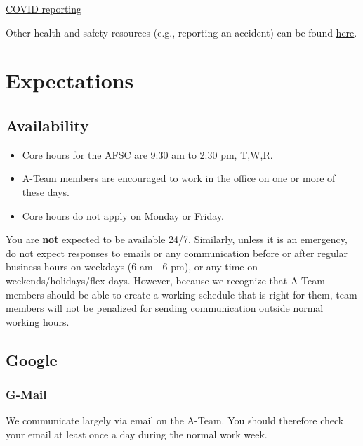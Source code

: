 \documentclass[
  letterpaper,
  DIV=11,
  numbers=noendperiod]{scrreprt}
\providecommand{\tightlist}{%
  \setlength{\itemsep}{0pt}\setlength{\parskip}{0pt}}\usepackage{longtable,booktabs,array}
\begin{document}
\href{https://sites.google.com/noaa.gov/myafsc/covid-19}{COVID
reporting}

Other health and safety resources (e.g., reporting an accident) can be
found \href{https://sites.google.com/noaa.gov/myafsc/safety}{here}.


\hypertarget{expectations}{%
\chapter{Expectations}\label{expectations}}

\hypertarget{availability}{%
\section{Availability}\label{availability}}

\begin{itemize}
\tightlist
\item
  Core hours for the AFSC are 9:30 am to 2:30 pm, T,W,R.\\
\item
  A-Team members are encouraged to work in the office on one or more of
  these days.\\
\item
  Core hours do not apply on Monday or Friday.
\end{itemize}

You are \textbf{not} expected to be available 24/7. Similarly, unless it
is an emergency, do not expect responses to emails or any communication
before or after regular business hours on weekdays (6 am - 6 pm), or any
time on weekends/holidays/flex-days. However, because we recognize that
A-Team members should be able to create a working schedule that is right
for them, team members will not be penalized for sending communication
outside normal working hours.

\hypertarget{google}{%
\section{Google}\label{google}}

\hypertarget{g-mail}{%
\subsection{G-Mail}\label{g-mail}}

We communicate largely via email on the A-Team. You should therefore
check your email at least once a day during the normal work week.
\end{document}
